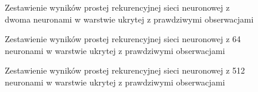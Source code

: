 \documentclass[10pt,a4paper]{article}
\begin{document}
\FloatBarrier
 \begin{figure}[!ht]
	\centering
	\caption{Zestawienie wyników prostej rekurencyjnej sieci neuronowej z dwoma neuronami w warstwie ukrytej z prawdziwymi obserwacjami}
	\label{figure:simple_rnn_2}
\end{figure}
\FloatBarrier
 \begin{figure}[!ht]
	\centering
	\caption{Zestawienie wyników prostej rekurencyjnej sieci neuronowej z 64 neuronami w warstwie ukrytej z prawdziwymi obserwacjami}
	\label{figure:simple_rnn_64}
\end{figure}
\FloatBarrier
 \begin{figure}[!ht]
	\centering
	\caption{Zestawienie wyników prostej rekurencyjnej sieci neuronowej z 512 neuronami w warstwie ukrytej z prawdziwymi obserwacjami}
	\label{figure:simple_rnn_512}
\end{figure}
\FloatBarrier
\end{document}
